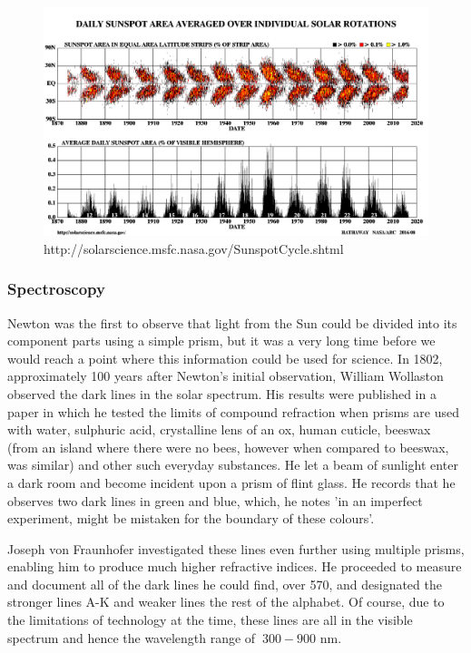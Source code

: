\begin{figure}
	\centering
	\includegraphics[width=\linewidth]{Chapter1/Figs/bfly}
	\caption{http://solarscience.msfc.nasa.gov/SunspotCycle.shtml}
	\label{fig:sunspot_count}
\end{figure}

\subsubsection{Spectroscopy}

Newton was the first to observe that light from the Sun could be divided into its component parts using a simple prism, but it was a very long time before we would reach a point where this information could be used for science.
In 1802, approximately 100 years after Newton's initial observation, William Wollaston observed the dark lines in the solar spectrum.
His results were published in a paper in which he tested the limits of compound refraction when prisms are used with water, sulphuric acid, crystalline lens of an ox, human cuticle, beeswax (from an island where there were no bees, however when compared to beeswax, was similar) and other such everyday substances.
He let a beam of sunlight enter a dark room and become incident upon a prism of flint glass.
He records that he observes two dark lines in green and blue, which, he notes 'in an imperfect experiment, might be mistaken for the boundary of these colours'.

Joseph von Fraunhofer investigated these lines even further using multiple prisms, enabling him to produce much higher refractive indices. 
He proceeded to measure and document all of the dark lines he could find, over 570, and designated the stronger lines A-K and weaker lines the rest of the alphabet.
Of course, due to the limitations of technology at the time, these lines are all in the visible spectrum and hence the wavelength range of $~300 - 900$ nm.

